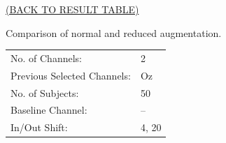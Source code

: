 \documentclass[oneside, a4paper,10pt]{report}
\begin{document}
\begin{landscape}
 


\hspace*{12cm}\hyperlink{tab:TestResults}{(BACK TO RESULT TABLE)}

Comparison of normal and reduced augmentation.

\begin{tabular}{ll}
  No. of Channels: & 2\\
  Previous Selected Channels: & Oz\\
  No. of Subjects: & 50\\
  Baseline Channel: & --\\
  In/Out Shift: & 4, 20\\
\end{tabular}


\end{landscape}
\end{document}
